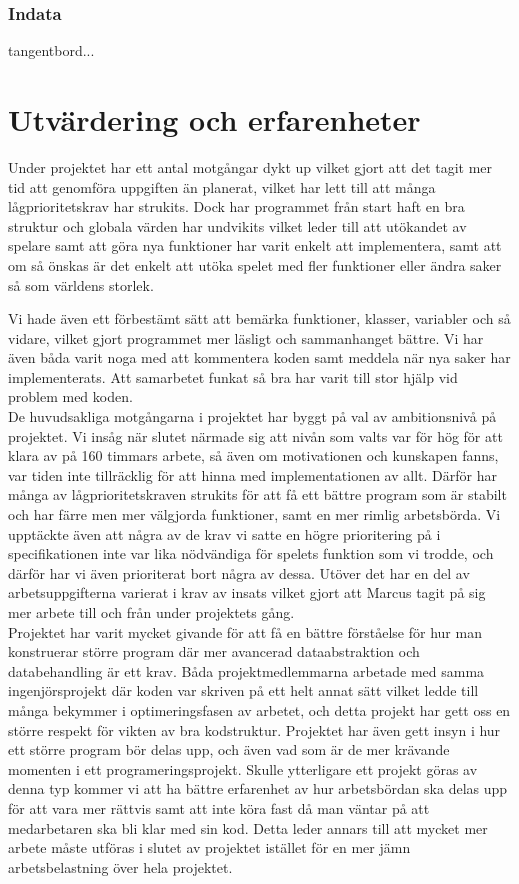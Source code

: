 \documentclass[12pt,a4paper]{article}
\begin{document}
\subsubsection{Indata} 
tangentbord...




\section{Utvärdering och erfarenheter}
    
Under projektet har ett antal motgångar dykt up vilket gjort att det tagit mer tid att genomföra uppgiften än planerat, vilket har lett till att många lågprioritetskrav har strukits. Dock har programmet från start haft en bra struktur och globala värden har undvikits vilket leder till att utökandet av spelare samt att göra nya funktioner har varit enkelt att implementera, samt att om så önskas är det enkelt att utöka spelet med fler funktioner eller ändra saker så som världens storlek.

Vi hade även ett förbestämt sätt att bemärka funktioner, klasser, variabler och så vidare, vilket gjort programmet mer läsligt och sammanhanget bättre.
Vi har även båda varit noga med att kommentera koden samt meddela när nya saker har implementerats.  Att samarbetet funkat så bra har varit till stor hjälp vid problem med koden. \\

De huvudsakliga motgångarna i projektet har byggt på val av ambitionsnivå på projektet. Vi insåg när slutet närmade sig att nivån som valts var för hög för att klara av på 160 timmars arbete, så även om motivationen och kunskapen fanns, var tiden inte tillräcklig för att hinna med implementationen av allt. Därför har många av lågprioritetskraven strukits för att få ett bättre program som är stabilt och har färre men mer välgjorda funktioner, samt en mer rimlig arbetsbörda. Vi upptäckte även att några av de krav vi satte en högre prioritering på i specifikationen inte var lika nödvändiga för spelets funktion som vi trodde, och därför har vi även prioriterat bort några av dessa. Utöver det har en del av arbetsuppgifterna varierat i krav av insats vilket gjort att Marcus tagit på sig mer arbete till och från under projektets gång. \\

Projektet har varit mycket givande för att få en bättre förståelse för hur man konstruerar större program där mer avancerad dataabstraktion och databehandling är ett krav. Båda projektmedlemmarna arbetade med samma ingenjörsprojekt där koden var skriven på ett helt annat sätt vilket ledde till många bekymmer i optimeringsfasen av arbetet, och detta projekt har gett oss en större respekt för vikten av bra kodstruktur. Projektet har även gett insyn i hur ett större program bör delas upp, och även vad som är de mer krävande momenten i ett programeringsprojekt. Skulle ytterligare ett projekt göras av denna typ kommer vi att ha bättre erfarenhet av hur arbetsbördan ska delas upp för att vara mer rättvis samt att inte köra fast då man väntar på att medarbetaren ska bli klar med sin kod. Detta leder annars till att mycket mer arbete måste utföras i slutet av projektet istället för en mer jämn arbetsbelastning över hela projektet. \\
\end{document}

